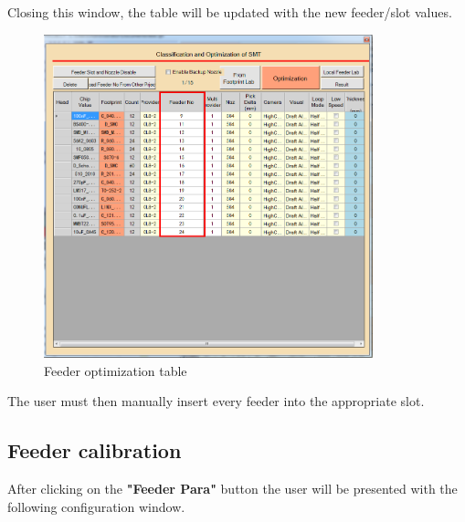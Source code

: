 \documentclass[a4paper,10pt]{report}
\begin{document}
Closing this window, the table will be updated with the new feeder/slot values.
\begin{figure}[!htb]
 \centering
 \includegraphics[width=0.85\textwidth]{images/scrot20.png}
 \caption{Feeder optimization table}
\end{figure}
The user must then manually insert every feeder into the appropriate slot.
\newpage
\subsection{Feeder calibration}
After clicking on the \textbf{"Feeder Para"} button the user will be presented with the following configuration window.
\end{document}
